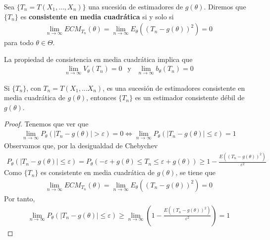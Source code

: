 \begin{defi}
Sea $\{T_n = T(X_1,...,X_n)\}$ una sucesión de estimadores de $g(\theta)$. Diremos que $\{T_n\}$ es \textbf{consistente en media cuadrática} si y solo si
\begin{align*}
    \lim_{n \to \infty}{ECM_{T_n}(\theta)} = \lim_{n \to \infty}{E_{\theta}((T_n - g(\theta))^2)} = 0
\end{align*}
para todo $\theta \in \Theta$.
\end{defi}

\begin{obs}
La propiedad de consistencia en media cuadrática implica que
\begin{align*}
    \lim_{n \to \infty}{V_{\theta}(T_n)} = 0 \ \ \text{ y } \ \ \lim_{n \to \infty}{b_{\theta}(T_n)} = 0
\end{align*}
\end{obs}

\begin{lema}
Si $\{T_n\}$, con $T_n = T(X_1,...X_n)$, es una sucesión de estimadores consistente en media cuadrática de $g(\theta)$, entonces $\{T_n\}$ es un estimador consistente débil de $g(\theta)$.
\end{lema}

\begin{proof}
Tenemos que ver que
\begin{align*}
    \lim_{n \to \infty}{P_{\theta}(|T_n - g(\theta)| > \varepsilon)} = 0 \Longleftrightarrow  \lim_{n \to \infty}{P_{\theta}(|T_n - g(\theta)| \leq \varepsilon)} = 1
\end{align*}
Observamos que, por la desigualdad de Chebychev
\begin{align*}
    {P_{\theta}(|T_n - g(\theta)| \leq \varepsilon)} = P_{\theta}(-\varepsilon + g(\theta) \leq T_n \leq \varepsilon + g(\theta)) \ge 1 - \frac{E((T_n - g(\theta))^2)}{\varepsilon^2}
\end{align*}
Como $\{T_n\}$ es consistente en media cuadrática de $g(\theta)$, se tiene que
\begin{align*}
    \lim_{n \to \infty}{ECM_{T_n}(\theta)} = \lim_{n \to \infty}{E_{\theta}((T_n - g(\theta))^2)} = 0
\end{align*}
Por tanto,
\begin{align*}
    \lim_{n \to \infty}{P_{\theta}(|T_n - g(\theta)| \leq \varepsilon)} \ge \lim_{n \to \infty}{\left(1 - \frac{E((T_n - g(\theta))^2)}{\varepsilon^2}\right)} = 1
\end{align*}
\end{proof}

